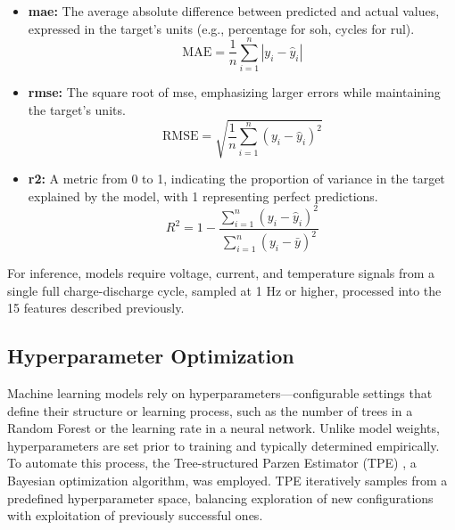 \begin{itemize}
    \item \textbf{\acf{mae}:} The average absolute difference between predicted and actual values, expressed in the target’s units (e.g., percentage for \ac{soh}, cycles for \ac{rul}).
    \begin{equation}
        \mathrm{MAE} = \frac{1}{n} \sum_{i=1}^{n} \left| y_i - \hat{y}_i \right|
        \label{eq:mae}    
    \end{equation}
    
    \item \textbf{\acf{rmse}:} The square root of \ac{mse}, emphasizing larger errors while maintaining the target’s units.
    \begin{equation}
        \mathrm{RMSE} = \sqrt{\frac{1}{n} \sum_{i=1}^{n} (y_i - \hat{y}_i)^2}
        \label{eq:rmse}
    \end{equation}
    
    \item \textbf{\acf{r2}:} A metric from 0 to 1, indicating the proportion of variance in the target explained by the model, with 1 representing perfect predictions.
    \begin{equation}
        R^2 = 1 - \frac{\sum_{i=1}^{n} (y_i - \hat{y}_i)^2}{\sum_{i=1}^{n} (y_i - \bar{y})^2}
        \label{eq:r2}
    \end{equation}
\end{itemize}

For inference, models require voltage, current, and temperature signals from a single full charge-discharge cycle, sampled at 1 Hz or higher, processed into the 15 features described previously.

\subsection{Hyperparameter Optimization}

Machine learning models rely on hyperparameters—configurable settings that define their structure or learning process, such as the number of trees in a Random Forest or the learning rate in a neural network. Unlike model weights, hyperparameters are set prior to training and typically determined empirically. To automate this process, the Tree-structured Parzen Estimator (TPE) \cite{tpe_2011}, a Bayesian optimization algorithm, was employed. TPE iteratively samples from a predefined hyperparameter space, balancing exploration of new configurations with exploitation of previously successful ones.

